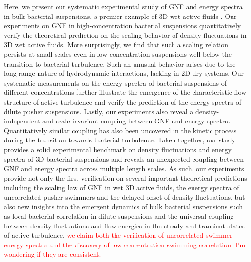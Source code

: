\documentclass[twocolumn,aps,prx,amsmath,amssymb,longbibliography]{revtex4-2}
\begin{document}
Here, we present our systematic experimental study of GNF and energy spectra in bulk bacterial suspensions, a premier example of 3D wet active fluids \cite{Marchetti2013}. Our experiments on GNF in high-concentration bacterial suspensions quantitatively verify the theoretical prediction on the scaling behavior of density fluctuations in 3D wet active fluids. More surprisingly, we find that such a scaling relation persists at small scales even in low-concentration suspensions well below the transition to bacterial turbulence. Such an unusual behavior arises due to the long-range nature of hydrodynamic interactions, lacking in 2D dry systems. Our systematic measurements on the energy spectra of bacterial suspensions of different concentrations further illustrate the emergence of the characteristic flow structure of active turbulence and verify the prediction of the energy spectra of dilute pusher suspensions. Lastly, our experiments also reveal a density-independent and scale-invariant coupling between GNF and energy spectra. Quantitatively similar coupling has also been uncovered in the kinetic process during the transition towards bacterial turbulence. Taken together, our study provides a solid experimental benchmark on density fluctuations and energy spectra of 3D bacterial suspensions and reveals an unexpected coupling between GNF and energy spectra across multiple length scales. As such, our experiments provide not only the first verification on several important theoretical predictions including the scaling law of GNF in wet 3D active fluids, the energy spectra of uncorrelated pusher swimmers and the delayed onset of density fluctuations, but also new insights into the emergent dynamics of bulk bacterial suspensions such as local bacterial correlation in dilute suspensions and the universal coupling between density fluctuations and flow energies in the steady and transient states of active turbulence. \textcolor{red}{we claim both the verification of uncorrelated swimmer energy spectra and the discovery of low concentration swimming correlation, I'm wondering if they are consistent.}
\end{document}
